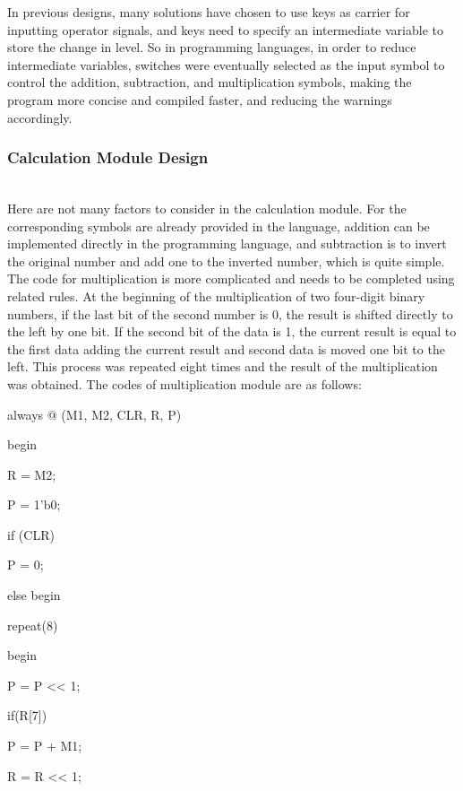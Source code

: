 \documentclass[conference,compsoc]{IEEEtran}
\begin{document}
In previous designs, many solutions have chosen to use keys as carrier for inputting operator signals, and keys need to specify an intermediate variable to store the change in level. So in programming languages, in order to reduce intermediate variables, switches were eventually selected as the input symbol to control the addition, subtraction, and multiplication symbols, making the program more concise and compiled faster, and reducing the warnings accordingly.

\subsubsection{Calculation Module Design}
\hfill\\

Here are not many factors to consider in the calculation module. For the corresponding symbols are already provided in the language, addition can be implemented directly in the programming language, and subtraction is to invert the original number and add one to the inverted number, which is quite simple. The code for multiplication is more complicated and needs to be completed using related rules. At the beginning of the multiplication of two four-digit binary numbers, if the last bit of the second number is 0, the result is shifted directly to the left by one bit. If the second bit of the data is 1, the current result is equal to the first data adding the current result and second data is moved one bit to the left. This process was repeated eight times and the result of the multiplication was obtained. The codes of multiplication module are as follows:

always @ (M1, M2, CLR, R, P) 
	
	begin
	
	\qquad R = M2;
	
	\qquad P = 1'b0;
	
	\qquad if (CLR)
	
	\qquad P = 0;
	
	\qquad else begin
	
	\qquad \qquad \qquad repeat(8)
	
	\qquad \qquad  \qquad begin
	
	\qquad \qquad \qquad\qquad  P = P << 1; 
	
	\qquad \qquad \qquad \qquad if(R[7])
	
	\qquad \qquad \qquad \qquad P = P + M1; 
	
	\qquad \qquad \qquad \qquad R = R <<  1;
	
\end{document}
